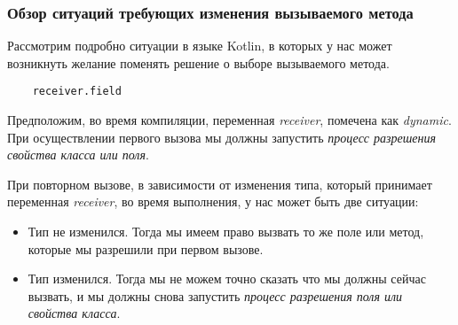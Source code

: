 \subsubsection{Обзор ситуаций требующих изменения вызываемого метода}
\label{sec:methodChangeOverview}

Рассмотрим подробно ситуации в языке Kotlin, в которых у нас может возникнуть желание поменять решение о выборе вызываемого метода.

\begin{verbatim}
    receiver.field
\end{verbatim}

Предположим, во время компиляции, переменная \textit{receiver}, помечена как \textit{dynamic}. При осуществлении первого
вызова мы должны запустить \textit{процесс разрешения свойства класса или поля}.


При повторном вызове, в зависимости от изменения типа, который принимает переменная \textit{receiver}, во время выполнения, у нас может быть две ситуации:

\begin{itemize}
    \item Тип не изменился. Тогда мы имеем право вызвать то же поле или метод, которые мы разрешили при первом вызове.
    \item Тип изменился. Тогда мы не можем точно сказать что мы должны сейчас вызвать, и мы должны снова запустить \textit{процесс разрешения поля или свойства класса}.
\end{itemize}

